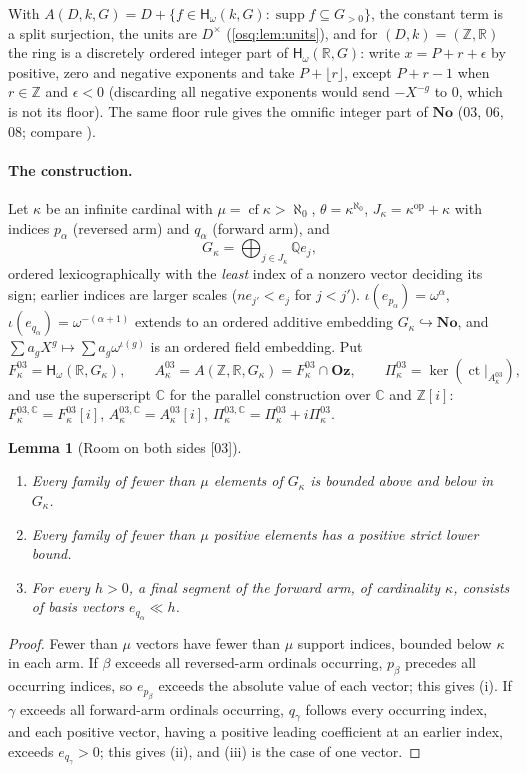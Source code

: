 \documentclass[11pt,letterpaper]{article}
\numberwithin{equation}{section}
\newtheorem{lemma}[lemma]{Lemma}
\theoremstyle{definition}
\theoremstyle{remark}
\theoremstyle{plain}
\newcommand{\No}{\mathbf{No}}
\newcommand{\Oz}{\mathbf{Oz}}
\newcommand{\Z}{\mathbb Z}
\newcommand{\Q}{\mathbb Q}
\newcommand{\R}{\mathbb R}
\newcommand{\C}{\mathbb C}
\newcommand{\Hc}[2]{\mathsf H_{\omega}(#1,#2)}
\newcommand{\ct}{\operatorname{ct}}
\newcommand{\supp}{\operatorname{supp}}
\newcommand{\cf}{\operatorname{cf}}
\newcommand{\src}[1]{\textup{\textsf{[#1]}}}
\begin{document}
With $A(D,k,G)=D+\{f\in\Hc kG:\supp f\subseteq G_{>0}\}$, the constant term is a split surjection,
the units are $D^\times$ (\cref{osq:lem:units}), and for $(D,k)=(\Z,\R)$ the ring is a discretely
ordered integer part of $\Hc\R G$: write $x=P+r+\epsilon$ by positive, zero and negative exponents and
take $P+\lfloor r\rfloor$, except $P+r-1$ when $r\in\Z$ and $\epsilon<0$ (discarding all negative
exponents would send $-X^{-g}$ to $0$, which is not its floor). The same floor rule gives the omnific
integer part of $\No$ (03, 06, 08; compare \cite{RepoTrig}).

\paragraph{The construction.} Let $\kappa$ be an infinite cardinal with $\mu=\cf\kappa>\aleph_0$,
$\theta=\kappa^{\aleph_0}$, $J_\kappa=\kappa^{\mathrm{op}}+\kappa$ with indices $p_\alpha$ (reversed arm)
and $q_\alpha$ (forward arm), and
\[
 G_\kappa=\bigoplus_{j\in J_\kappa}\Q e_j,
\]
ordered lexicographically with the \emph{least} index of a nonzero vector deciding its sign; earlier
indices are larger scales ($ne_{j'}<e_j$ for $j<j'$). $\iota(e_{p_\alpha})=\omega^\alpha$,
$\iota(e_{q_\alpha})=\omega^{-(\alpha+1)}$ extends to an ordered additive embedding
$G_\kappa\hookrightarrow\No$, and $\sum a_gX^g\mapsto\sum a_g\omega^{\iota(g)}$ is an ordered field
embedding. Put
\[
 F^{03}_\kappa=\Hc\R{G_\kappa},\qquad A^{03}_\kappa=A(\Z,\R,G_\kappa)=F^{03}_\kappa\cap\Oz,\qquad
 \Pi^{03}_\kappa=\ker(\ct|_{A^{03}_\kappa}),
\]
and use the superscript $\C$ for the parallel construction over $\C$ and $\Z[i]$:
$F^{03,\C}_\kappa=F^{03}_\kappa[i]$, $A^{03,\C}_\kappa=A^{03}_\kappa[i]$,
$\Pi^{03,\C}_\kappa=\Pi^{03}_\kappa+i\Pi^{03}_\kappa$.

\begin{lemma}[Room on both sides \src{03}]\label{osq:lem:twosided}
\leavevmode
\begin{enumerate}
\item Every family of fewer than $\mu$ elements of $G_\kappa$ is bounded above and below in $G_\kappa$.
\item Every family of fewer than $\mu$ positive elements has a positive strict lower bound.
\item For every $h>0$, a final segment of the forward arm, of cardinality $\kappa$, consists of basis
vectors $e_{q_\alpha}\ll h$.
\end{enumerate}
\end{lemma}
\begin{proof}
Fewer than $\mu$ vectors have fewer than $\mu$ support indices, bounded below $\kappa$ in each arm. If
$\beta$ exceeds all reversed-arm ordinals occurring, $p_\beta$ precedes all occurring indices, so
$e_{p_\beta}$ exceeds the absolute value of each vector; this gives (i). If $\gamma$ exceeds all
forward-arm ordinals occurring, $q_\gamma$ follows every occurring index, and each positive vector,
having a positive leading coefficient at an earlier index, exceeds $e_{q_\gamma}>0$; this gives (ii),
and (iii) is the case of one vector.
\end{proof}
\end{document}
